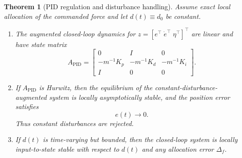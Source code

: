 \documentclass[11pt]{article}
\newtheorem{theorem}{Theorem}
\theoremstyle{definition}
\begin{document}
\begin{theorem}[PID regulation and disturbance handling]
Assume exact local allocation of the commanded force and let $d(t) \equiv d_0$ be constant.

\begin{enumerate}[label=\textbf{(\alph*)}, leftmargin=1.5em]
    \item The augmented closed-loop dynamics for $z = [e^\top\; \dot e^\top\; \eta^\top]^\top$ are linear and have state matrix
    \begin{equation}
    A_{\mathrm{PID}} =
    \begin{bmatrix}
    0 & I & 0 \\
    -m^{-1}K_p & -m^{-1}K_d & -m^{-1}K_i \\
    I & 0 & 0
    \end{bmatrix}.
    \label{eq:Apid}
    \end{equation}

    \item If $A_{\mathrm{PID}}$ is Hurwitz, then the equilibrium of the constant-disturbance-augmented system is locally asymptotically stable, and the position error satisfies
    \[
    e(t) \to 0.
    \]
    Thus constant disturbances are rejected.

    \item If $d(t)$ is time-varying but bounded, then the closed-loop system is locally input-to-state stable with respect to $d(t)$ and any allocation error $\Delta_f$.
\end{enumerate}
\end{theorem}
\end{document}
